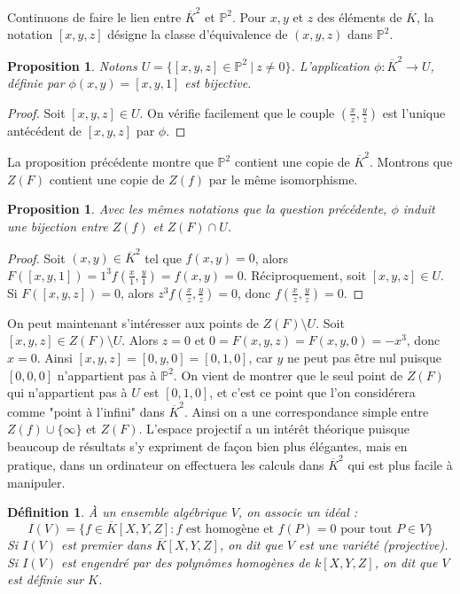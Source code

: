 \documentclass{article}
\theoremstyle{plain}%
\newtheorem{prop}[thm]{Proposition}
\newtheorem{deff}[thm]{Définition}
\theoremstyle{definition}%
\newcommand{\ol}{\overline}
\begin{document}
\vspace{0.5em}

Continuons de faire le lien entre $\ol K^2$ et $\mathbb P^2$. Pour $x, y$ et $z$ des éléments de $\ol K$, la notation $[x, y, z]$ désigne la classe d'équivalence de $(x, y, z)$ dans $\mathbb P^2$.

\begin{prop}
 Notons $U = \{[x, y, z]\in \mathbb P^2\ |\ z\neq 0\}$. L'application $\phi : \ol K^2 \to U$, définie par $\phi(x, y) = [x, y, 1]$ est bijective. 
\end{prop}

\begin{proof}
  Soit $[x, y, z]\in U$. On vérifie facilement que le couple $(\frac{x}{z}, \frac{y}{z})$ est l'unique antécédent de $[x, y, z]$ par $\phi$.
\end{proof}

La proposition précédente montre que $\mathbb P^2$ contient une copie de $\ol K^2$. Montrons que $Z(F )$ contient une copie de $Z(f)$ par le même isomorphisme. 

\begin{prop}
  Avec les mêmes notations que la question précédente, $\phi$ induit une bijection entre $Z(f)$ et $Z(F) \cap U$.
\end{prop}

\begin{proof}
  Soit $(x, y)\in\ol K^2$ tel que $f(x, y) = 0$, alors $F([x, y, 1]) = 1^3f(\frac{x}{1}, \frac{y}{1}) = f(x, y) = 0$.
  Réciproquement, soit $[x, y, z]\in U$. Si $F([x, y, z]) = 0$, alors $z^3f(\frac{x}{z}, \frac{y}{z}) = 0$, donc $f(\frac{x}{z}, \frac{y}{z}) = 0$.
\end{proof}

On peut maintenant s'intéresser aux points de $Z(F)\setminus U$. Soit $[x, y, z]\in Z(F)\setminus U$. Alors $z=0$ et $0 = F(x,y, z) = F(x, y, 0) = -x^3$, donc $x=0$. Ainsi $[x, y, z] = [0, y, 0] = [0, 1, 0]$, car $y$ ne peut pas être nul puisque $[0, 0, 0]$ n'appartient pas à $\mathbb P^2$. On vient de montrer que le seul point de $Z(F)$ qui n'appartient pas à $U$ est $[0, 1, 0]$, et c'est ce point que l'on considérera comme "point à l'infini" dans $\ol K^2$. Ainsi on a une correspondance simple entre $Z(f) \cup \{\infty\}$ et $Z(F)$.
L'espace projectif a un intérêt théorique puisque beaucoup de résultats s'y expriment de façon bien plus élégantes, mais en pratique, dans un ordinateur on effectuera les calculs dans $\ol K^2$ qui est plus facile à manipuler.

\begin{deff}
  À un ensemble algébrique $V$, on associe un idéal :
  $$I(V) = \{ f\in \overline{K}[X, Y, Z] : f \text{ est homogène et } f(P) = 0 \text{ pour tout } P\in V \}$$
  Si $I(V)$ est premier dans $ \overline{K}[X, Y, Z] $, on dit que $V$ est une variété (projective). Si $I(V)$ est engendré par des polynômes homogènes de $k[X, Y, Z]$, on dit que $V$ est définie sur $K$.  
\end{deff}
\end{document}

